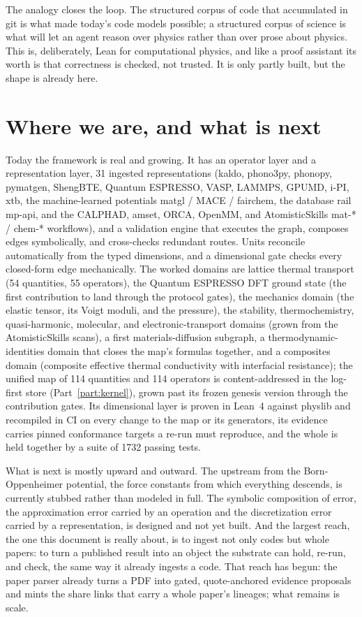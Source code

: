 \documentclass[11pt,a4paper]{article}
\begin{document}
The analogy closes the loop. The structured corpus of code that accumulated in git
is what made today's code models possible; a structured corpus of science is what
will let an agent reason over physics rather than over prose about physics. This
is, deliberately, Lean for computational physics, and like a proof assistant its
worth is that correctness is checked, not trusted. It is only partly built, but the
shape is already here.

\section{Where we are, and what is next}

Today the framework is real and growing. It has an operator layer and a
representation layer, 31 ingested representations (kaldo, phono3py, phonopy,
pymatgen, ShengBTE, Quantum ESPRESSO, VASP, LAMMPS, GPUMD, i-PI, xtb, the
machine-learned potentials matgl / MACE / fairchem, the database rail mp-api,
and the CALPHAD, amset, ORCA, OpenMM, and AtomisticSkills mat-* / chem-*
workflows), and a
validation engine that executes the graph, composes
edges symbolically, and cross-checks redundant routes. Units reconcile
automatically from the typed dimensions, and a dimensional gate checks every
closed-form edge mechanically. The worked domains are lattice thermal
transport (54 quantities, 55 operators), the Quantum ESPRESSO DFT ground
state (the first contribution to land through the protocol gates), the
mechanics domain (the elastic tensor, its Voigt moduli, and the pressure), the
stability, thermochemistry, quasi-harmonic, molecular, and electronic-transport
domains (grown from the AtomisticSkills scans),
a first materials-diffusion subgraph, a thermodynamic-identities domain that
closes the map's formulas together, and a composites domain (composite effective
thermal conductivity with interfacial resistance); the unified map of
114 quantities and 114 operators is content-addressed in the log-first store
(Part~\ref{part:kernel}), grown past its frozen genesis version through the
contribution gates. Its dimensional layer is proven in Lean~4 against physlib
and recompiled in CI on every change to the map or its generators, its evidence carries pinned conformance
targets a re-run must reproduce, and the whole is held together by a suite of
1732 passing tests.

What is next is mostly upward and outward. The upstream from the
Born-Oppenheimer potential, the force constants from which everything descends, is
currently stubbed rather than modeled in full. The symbolic composition of error,
the approximation error carried by an operation and the discretization error
carried by a representation, is designed and not yet built. And the largest reach,
the one this document is really about, is to ingest not only codes but whole
papers: to turn a published result into an object the substrate can hold, re-run,
and check, the same way it already ingests a code. That reach has begun: the
paper parser already turns a PDF into gated, quote-anchored evidence proposals
and mints the share links that carry a whole paper's lineages; what remains is
scale.
\end{document}
